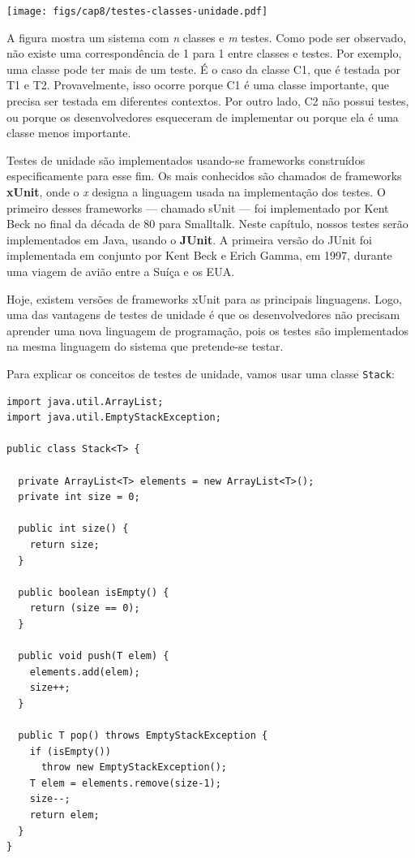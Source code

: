 \documentclass[
  11pt,
  twoside]{book}
\newcommand{\passthrough}[1]{#1}
\let\origfigure\figure
\let\endorigfigure\endfigure
\renewenvironment{figure}[1][2] {
    \expandafter\origfigure\expandafter[!h]
} {
    \endorigfigure
}
\begin{document}
\begin{figure}
\centering
\texttt{[image: figs/cap8/testes-classes-unidade.pdf]}
\caption{Correspondência entre classes e testes}
\end{figure}

A figura mostra um sistema com \emph{n} classes e \emph{m} testes. Como
pode ser observado, não existe uma correspondência de 1 para 1 entre
classes e testes. Por exemplo, uma classe pode ter mais de um teste. É o
caso da classe C1, que é testada por T1 e T2. Provavelmente, isso ocorre
porque C1 é uma classe importante, que precisa ser testada em diferentes
contextos. Por outro lado, C2 não possui testes, ou porque os
desenvolvedores esqueceram de implementar ou porque ela é uma classe
menos importante.

 
   
Testes de unidade são implementados usando-se frameworks construídos
especificamente para esse fim. Os mais conhecidos são chamados de
frameworks \textbf{xUnit}, onde o \emph{x} designa a linguagem usada na
implementação dos testes. O primeiro desses frameworks --- chamado sUnit
--- foi implementado por Kent Beck no final da década de 80 para
Smalltalk. Neste capítulo, nossos testes serão implementados em Java,
usando o \textbf{JUnit}. A primeira versão do JUnit foi implementada em
conjunto por Kent Beck e Erich Gamma, em 1997, durante uma viagem de
avião entre a Suíça e os EUA.

Hoje, existem versões de frameworks xUnit para as principais linguagens.
Logo, uma das vantagens de testes de unidade é que os desenvolvedores
não precisam aprender uma nova linguagem de programação, pois os testes
são implementados na mesma linguagem do sistema que pretende-se testar.

Para explicar os conceitos de testes de unidade, vamos usar uma classe
\passthrough{\lstinline!Stack!}:

\begin{lstlisting}
import java.util.ArrayList;
import java.util.EmptyStackException;

public class Stack<T> {

  private ArrayList<T> elements = new ArrayList<T>();
  private int size = 0;

  public int size() {
    return size;
  }

  public boolean isEmpty() {
    return (size == 0);
  }

  public void push(T elem) {
    elements.add(elem);
    size++;
  }

  public T pop() throws EmptyStackException {
    if (isEmpty())
      throw new EmptyStackException();
    T elem = elements.remove(size-1);
    size--;
    return elem;
  }
}
\end{lstlisting}
\end{document}
